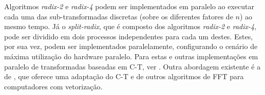 Algoritmos \textit{radix-2} e \textit{radix-4} podem ser implementados em paralelo ao executar cada uma das sub-transformadas discretas (sobre os diferentes fatores de $n$) ao mesmo tempo. Já o \textit{split-radix}, que é composto dos algoritmos \textit{radix-2} e \textit{radix-4}, pode ser dividido em dois processos independentes para cada um destes. Estes, por sua vez, podem ser implementados paralelamente, configurando o cenário de máxima utilização do hardware paralelo. Para estas e outras implementações em paralelo de transformadas baseadas em C-T, ver . Outra abordagem existente é a de , que oferece uma adaptação do C-T e de outros algoritmos de FFT para computadores com vetorização.%


